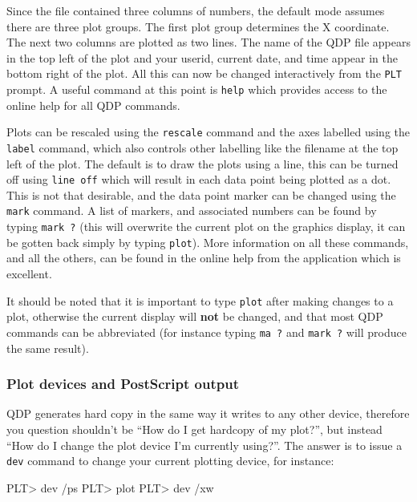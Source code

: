 \documentclass[twoside,11pt]{starlink}
\begin{document}

Since the file contained three columns of numbers, the default mode
assumes there are three plot groups. The first plot group determines
the X coordinate. The next two columns are plotted as two lines. The
name of the QDP file appears in the top left of the plot and your
userid, current date, and time appear in the bottom right of the plot.
All this can now be changed interactively from the \texttt{PLT} prompt. A
useful command at this point is \texttt{help} which provides access to
the online help for all QDP commands.

Plots can be rescaled using the \texttt{rescale} command and the axes
labelled using the \texttt{label} command, which also controls other
labelling like the filename at the top left of the plot. The default
is to draw the plots using a line, this can be turned off using \texttt{line off} which will result in each data point being plotted as a dot.
This is not that desirable, and the data point marker can be changed
using the \texttt{mark} command. A list of markers, and associated
numbers can be found by typing \texttt{mark ?} (this will overwrite the
current plot on the graphics display, it can be gotten back simply by
typing \texttt{plot}). More information on all these commands, and all
the others, can be found in the online help from the application which
is excellent.

It should be noted that it is important to type \texttt{plot} after
making changes to a plot, otherwise the current display will \textbf{not}
be changed, and that most QDP commands can be abbreviated (for
instance typing \texttt{ma ?} and \texttt{mark ?} will produce the same
result).

\subsubsection{Plot devices and PostScript output}

QDP generates hard copy in the same way it writes to any other device,
therefore you question shouldn't be ``How do I get hardcopy of my
plot?'', but instead ``How do I change the plot device I'm currently
using?''. The answer is to issue a \texttt{dev} command to change your
current plotting device, for instance:

\begin{small}
\begin{terminalv}
PLT> dev /ps
PLT> plot
PLT> dev /xw
\end{terminalv}
\end{small}
\end{document}
